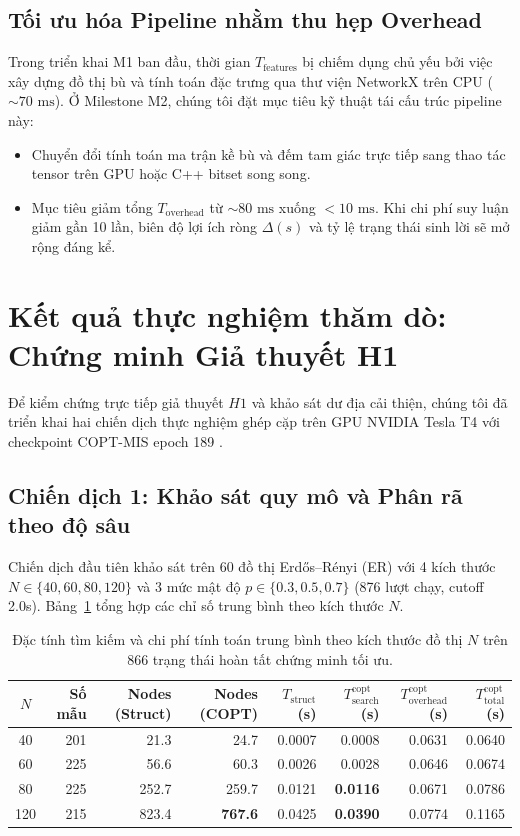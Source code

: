 \documentclass[11pt,a4paper]{article}
\begin{document}
\subsection{Tối ưu hóa Pipeline nhằm thu hẹp Overhead}
Trong triển khai M1 ban đầu, thời gian $T_{\mathrm{features}}$ bị chiếm dụng chủ yếu bởi việc xây dựng đồ thị bù và tính toán đặc trưng qua thư viện NetworkX trên CPU ($\sim 70\text{ ms}$). Ở Milestone M2, chúng tôi đặt mục tiêu kỹ thuật tái cấu trúc pipeline này:
\begin{itemize}[leftmargin=*]
    \item Chuyển đổi tính toán ma trận kề bù và đếm tam giác trực tiếp sang thao tác tensor trên GPU hoặc C++ bitset song song.
    \item Mục tiêu giảm tổng $T_{\mathrm{overhead}}$ từ $\sim 80\text{ ms}$ xuống $< 10\text{ ms}$. Khi chi phí suy luận giảm gần 10 lần, biên độ lợi ích ròng $\Delta(s)$ và tỷ lệ trạng thái sinh lời sẽ mở rộng đáng kể.
\end{itemize}

\section{Kết quả thực nghiệm thăm dò: Chứng minh Giả thuyết H1}
Để kiểm chứng trực tiếp giả thuyết $H1$ và khảo sát dư địa cải thiện, chúng tôi đã triển khai hai chiến dịch thực nghiệm ghép cặp trên GPU NVIDIA Tesla T4 với checkpoint COPT-MIS epoch 189 \citep{canturk2026copt}.

\subsection{Chiến dịch 1: Khảo sát quy mô và Phân rã theo độ sâu}
Chiến dịch đầu tiên khảo sát trên 60 đồ thị Erd\H{o}s--R\'enyi (ER) với 4 kích thước $N \in \{40, 60, 80, 120\}$ và 3 mức mật độ $p \in \{0.3, 0.5, 0.7\}$ (876 lượt chạy, cutoff 2.0s). Bảng~\ref{tab:m1_scaling} tổng hợp các chỉ số trung bình theo kích thước $N$.

\begin{table}[ht]
\centering
\footnotesize
\setlength{\tabcolsep}{3.5pt}
\caption{Đặc tính tìm kiếm và chi phí tính toán trung bình theo kích thước đồ thị $N$ trên 866 trạng thái hoàn tất chứng minh tối ưu.}
\label{tab:m1_scaling}
\begin{tabular}{crrrrrrr}
\toprule
$N$ & Số mẫu & Nodes (Struct) & Nodes (COPT) & $T_{\mathrm{struct}}$ (s) & $T_{\mathrm{search}}^{\mathrm{copt}}$ (s) & $T_{\mathrm{overhead}}^{\mathrm{copt}}$ (s) & $T_{\mathrm{total}}^{\mathrm{copt}}$ (s) \\

\midrule
40  & 201 & 21.3  & 24.7  & 0.0007 & 0.0008 & 0.0631 & 0.0640 \\
60  & 225 & 56.6  & 60.3  & 0.0026 & 0.0028 & 0.0646 & 0.0674 \\
80  & 225 & 252.7 & 259.7 & 0.0121 & \textbf{0.0116} & 0.0671 & 0.0786 \\
120 & 215 & 823.4 & \textbf{767.6} & 0.0425 & \textbf{0.0390} & 0.0774 & 0.1165 \\
\bottomrule
\end{tabular}
\end{table}
\end{document}
